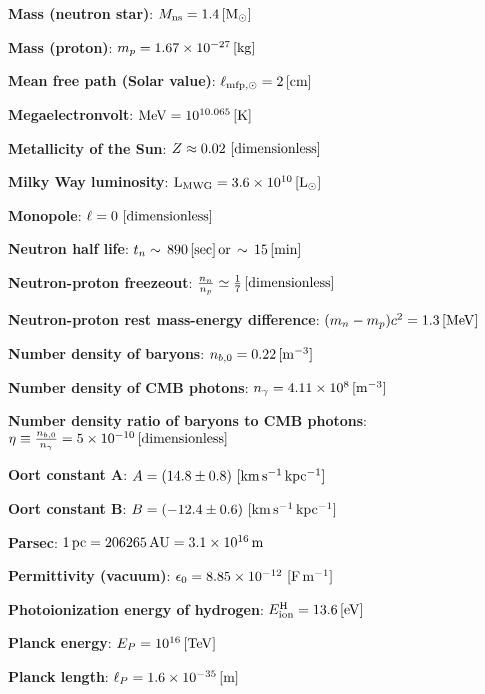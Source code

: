 \documentclass[a4paper,10pt]{article}
\begin{document}
{\noindent}\textbf{Mass (neutron star)}: $M_{\rm ns} = 1.4\,[{\rm M_\odot}]$

{\noindent}\textbf{Mass (proton)}: $m_p = 1.67\times10^{-27}\,[{\rm kg}]$

{\noindent}\textbf{Mean free path (Solar value)}: $\ell_{{\rm mfp},\odot} = 2\,[{\rm cm}]$

{\noindent}\textbf{Megaelectronvolt}: ${\rm MeV} = 10^{10.065}\,[{\rm K}]$

{\noindent}\textbf{Metallicity of the Sun}: $Z\approx0.02 ~ [{\rm dimensionless}]$

{\noindent}\textbf{Milky Way luminosity}: ${\rm L_{MWG}} = 3.6\times10^{10}\,[{\rm L}_\odot]$

{\noindent}\textbf{Monopole}: $\ell=0 ~ [{\rm dimensionless}]$

{\noindent}\textbf{Neutron half life}: $t_n\sim\,890\,[{\rm sec}]\,{\rm or}\,\sim\,15\,[{\rm min}]$

{\noindent}\textbf{Neutron-proton freezeout}: $\frac{n_n}{n_p} \simeq \frac{1}{7}\,[{\rm dimensionless}]$

{\noindent}\textbf{Neutron-proton rest mass-energy difference}: $(m_n-m_p)c^2 = 1.3\,[{\rm MeV}]$

{\noindent}\textbf{Number density of baryons}: $n_{b,0} = 0.22\,[{\rm m^{-3}}]$

{\noindent}\textbf{Number density of CMB photons}: $n_\gamma= 4.11\times10^8\,[{\rm m^{-3}}]$

{\noindent}\textbf{Number density ratio of baryons to CMB photons}: $\eta \equiv \frac{n_{b,0}}{n_\gamma} = 5\times10^{-10}\,[{\rm dimensionless}]$

{\noindent}\textbf{Oort constant A}: $A = (14.8\pm0.8) ~ [{\rm km\,s^{-1}\,kpc^{-1}}]$

{\noindent}\textbf{Oort constant B}: $B = (-12.4\pm0.6) ~ [{\rm km\,s^{-1}\,kpc^{-1}}]$

{\noindent}\textbf{Parsec}: $1\,{\rm pc} = 206265\,{\rm AU} = 3.1\times10^{16}\,{\rm m}$

{\noindent}\textbf{Permittivity (vacuum)}: $\epsilon_0 = 8.85\times10^{-12} ~ [{\rm F\,m^{-1}}]$

{\noindent}\textbf{Photoionization energy of hydrogen}: $E^\mathrm{H}_\mathrm{ion} = 13.6\,[{\rm eV}]$

{\noindent}\textbf{Planck energy}: $E_P = 10^{16}\,[{\rm TeV}]$

{\noindent}\textbf{Planck length}: $\ell_P = 1.6\times10^{-35}\,[{\rm m}]$
\end{document}
